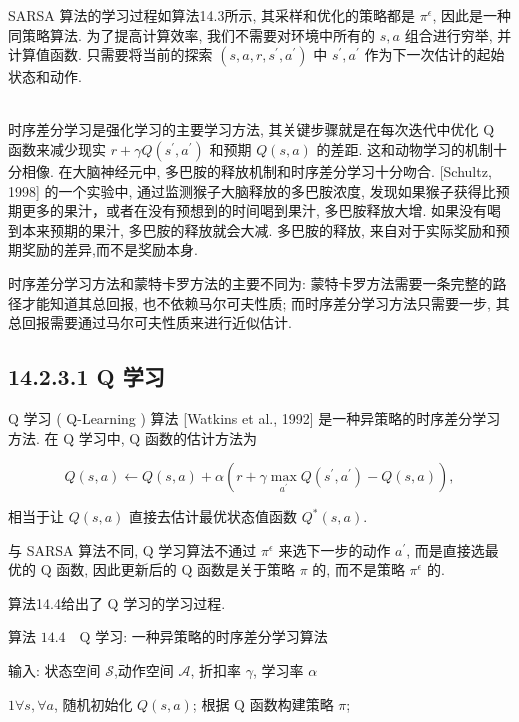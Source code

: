 \documentclass[10pt]{article}
\begin{document}
SARSA 算法的学习过程如算法14.3所示, 其采样和优化的策略都是 $\pi^{\epsilon}$, 因此是一种同策略算法. 为了提高计算效率, 我们不需要对环境中所有的 $s, a$ 组合进行穷举, 并计算值函数. 只需要将当前的探索 $\left(s, a, r, s^{\prime}, a^{\prime}\right)$ 中 $s^{\prime}, a^{\prime}$ 作为下一次估计的起始状态和动作.

\\
时序差分学习是强化学习的主要学习方法, 其关键步骤就是在每次迭代中优化 $\mathrm{Q}$ 函数来减少现实 $r+\gamma Q\left(s^{\prime}, a^{\prime}\right)$ 和预期 $Q(s, a)$ 的差距. 这和动物学习的机制十分相像. 在大脑神经元中, 多巴胺的释放机制和时序差分学习十分吻合. [Schultz, 1998] 的一个实验中, 通过监测猴子大脑释放的多巴胺浓度, 发现如果猴子获得比预期更多的果汁，或者在没有预想到的时间喝到果汁, 多巴胺释放大增. 如果没有喝到本来预期的果汁, 多巴胺的释放就会大减. 多巴胺的释放, 来自对于实际奖励和预期奖励的差异,而不是奖励本身.

时序差分学习方法和蒙特卡罗方法的主要不同为: 蒙特卡罗方法需要一条完整的路径才能知道其总回报, 也不依赖马尔可夫性质; 而时序差分学习方法只需要一步, 其总回报需要通过马尔可夫性质来进行近似估计.

\subsection*{14.2.3.1 Q 学习}
$\mathrm{Q}$ 学习 ( Q-Learning ) 算法 [Watkins et al., 1992] 是一种异策略的时序差分学习方法. 在 $\mathrm{Q}$ 学习中, $\mathrm{Q}$ 函数的估计方法为


\begin{equation*}
Q(s, a) \leftarrow Q(s, a)+\alpha\left(r+\gamma \max _{a^{\prime}} Q\left(s^{\prime}, a^{\prime}\right)-Q(s, a)\right), \tag{14.40}
\end{equation*}


相当于让 $Q(s, a)$ 直接去估计最优状态值函数 $Q^{*}(s, a)$.

与 SARSA 算法不同, $\mathrm{Q}$ 学习算法不通过 $\pi^{\epsilon}$ 来选下一步的动作 $a^{\prime}$, 而是直接选最优的 $\mathrm{Q}$ 函数, 因此更新后的 $\mathrm{Q}$ 函数是关于策略 $\pi$ 的, 而不是策略 $\pi^{\epsilon}$ 的.

算法14.4给出了 $\mathrm{Q}$ 学习的学习过程.

算法 $14.4 \quad \mathrm{Q}$ 学习: 一种异策略的时序差分学习算法

输入: 状态空间 $\mathcal{S}$,动作空间 $\mathcal{A}$, 折扣率 $\gamma$, 学习率 $\alpha$

$1 \forall s, \forall a$, 随机初始化 $Q(s, a)$; 根据 $\mathrm{Q}$ 函数构建策略 $\pi$;
\end{document}
